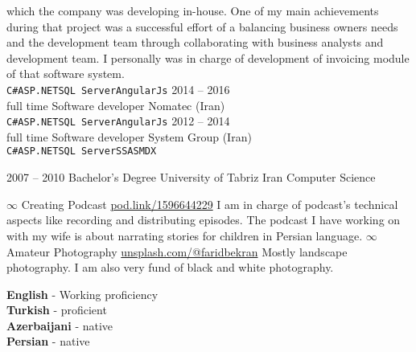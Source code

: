\documentclass[9pt]{developercv} %
\begin{document}
\begin{entrylist}
{which the company was developing in-house. One of my main achievements during
that project was a successful effort of a balancing business owners needs and the
development team through collaborating with business analysts and development
team. I personally was in charge of development of invoicing module of that
software system. \\ \texttt{C\#}\slashsep\texttt{ASP.NET}\slashsep\texttt{SQL Server}\slashsep\texttt{AngularJs}}
\entry
		{2014 -- 2016\\\footnotesize{full time}}
		{Software developer}
		{Nomatec (Iran)}
		{\\ \texttt{C\#}\slashsep\texttt{ASP.NET}\slashsep\texttt{SQL Server}\slashsep\texttt{AngularJs}}
	\entry
		{2012 -- 2014\\\footnotesize{full time}}
		{Software developer}
		{System Group (Iran)}
		{\\ \texttt{C\#}\slashsep\texttt{ASP.NET}\slashsep\texttt{SQL Server}\slashsep\texttt{SSAS}\slashsep\texttt{MDX}}
\end{entrylist}



\begin{entrylist}
	\entry
		{2007 -- 2010}
		{Bachelor's Degree}
		{University of Tabriz Iran}
		{Computer Science}
\end{entrylist}

\begin{entrylist}
		\entry
		{$\infty$}
		{Creating Podcast}
		{\href{https://pod.link/1596644229}{pod.link/1596644229}}
		{I am in charge of podcast's technical aspects like recording and distributing episodes. The podcast I have working on with my wife is about narrating stories for children in Persian language.}
		\entry
		{$\infty$}
		{Amateur Photography}
		{\href{https://unsplash.com/@faridbekran}{unsplash.com/@faridbekran}}
		{Mostly landscape photography. I am also very fund of black and white photography.}

\end{entrylist}

\begin{minipage}[t]{0.3\textwidth}
	\vspace{-\baselineskip} %

	
	\textbf{English} - Working proficiency\\
	\textbf{Turkish} - proficient\\
	\textbf{Azerbaijani} - native\\	
	\textbf{Persian} - native

\end{minipage}


\end{document}

